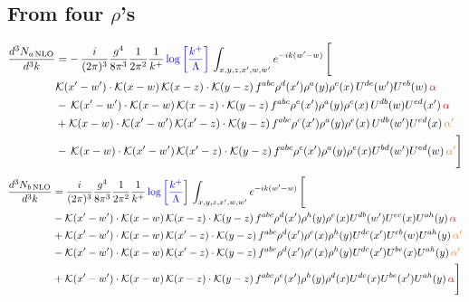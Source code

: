 \documentclass[9pt]{article}
\numberwithin{equation}{section}
\begin{document}
\subsection{From four $\rho$'s}
\begin{align}
    \frac{d^{3}N_{a\,\rm NLO}}{d^{3}k} & = -\,\frac{i}{(2\pi)^{3}}\frac{g^{4}}{8\pi^{3}}\frac{1}{2\pi^{2}} \frac{1}{k^{+}}\,{\color{blue}\log{\left[\frac{k^{+}}{\Lambda}\right]}}\,\int_{x,y,z,x^{\prime},w,w^{\prime}}e^{-ik(w^{\prime}-w)}\, \Bigg[\notag \\ &  \mathcal{K}(x'-w')\cdot \mathcal{K}(x-w)\, \mathcal{K}(x-z)\cdot \mathcal{K}(y-z)\, f^{a b c} \rho^{d}(x') \rho^{a}(y) \rho^{c}(x)\,U^{d e}(w') U^{e b}(w)\, {\color{red} \alpha} \nonumber\\
    &  -\,\mathcal{K}(x'-w')\cdot \mathcal{K}(x-w)\, \mathcal{K}(x-z)\cdot \mathcal{K}(y-z)\, f^{a b c} \rho^{e}(x') \rho^{a}(y) \rho^{c}(x)\, U^{d b}(w) U^{e d}(x')\, {\color{red} \alpha}\nonumber\\
    & + \mathcal{K}(x-w)\cdot \mathcal{K}(x'-w')\, \mathcal{K}(x'-z)\cdot \mathcal{K}(y-z)\, f^{a b c} \rho^{c}(x') \rho^{a}(y) \rho^{e}(x)\,U^{d b}(w') U^{e d}(x)\, {\color{orange} \alpha'} \nonumber\\
    & -\,\mathcal{K}(x-w)\cdot \mathcal{K}(x'-w')\, \mathcal{K}(x'-z)\cdot \mathcal{K}(y-z)\, f^{a b c} \rho^{c}(x') \rho^{a}(y) \rho^{e}(x) U^{b d}(w') U^{e d}(w)\, {\color{orange} \alpha'}\Bigg]
\end{align}
\begin{align}
      \frac{d^{3}N_{b\,\rm NLO}}{d^{3}k} & = \frac{i}{(2\pi)^{3}}\frac{g^{4}}{8\pi^{3}}\frac{1}{2\pi^{2}} \frac{1}{k^{+}}\,{\color{blue}\log{\left[\frac{k^{+}}{\Lambda}\right]}}\,\int_{x,y,z,x^{\prime},w,w^{\prime}}e^{-ik(w^{\prime}-w)}\, \Bigg[\notag \\ & - \mathcal{K}(x'-w')\cdot \mathcal{K}(x-w)\, \mathcal{K}(x-z)\cdot \mathcal{K}(y-z)\, f^{a b c} \rho^{d}(x') \rho^{h}(y) \rho^{e}(x) U^{d b}(w') U^{e c}(x) U^{a h}(y)\, {\color{red} \alpha}\nonumber\\
    &+ \mathcal{K}(x'-w')\cdot \mathcal{K}(x-w)\,\mathcal{K}(x'-z)\cdot \mathcal{K}(y-z)\, f^{a b c} \rho^{d}(x') \rho^{e}(x) \rho^{h}(y) U^{d c}(x') U^{e b}(w) U^{a h}(y)\, {\color{orange} \alpha'}\nonumber\\
    &- \mathcal{K}(x'-w')\cdot \mathcal{K}(x-w)\,\mathcal{K}(x'-z)\cdot \mathcal{K}(y-z)\, f^{a b c} \rho^{d}(x') \rho^{e}(x) \rho^{h}(y) U^{d c}(x') U^{b e}(x) U^{a h}(y)\, {\color{orange} \alpha'}\nonumber\\
    &+  \mathcal{K}(x'-w')\cdot \mathcal{K}(x-w)\, \mathcal{K}(x-z)\cdot \mathcal{K}(y-z)\, f^{a b c} \rho^{e}(x') \rho^{h}(y) \rho^{d}(x) U^{d c}(x) U^{b e}(x') U^{a h}(y)\, {\color{red} \alpha} \Bigg]
\end{align}
\end{document}
